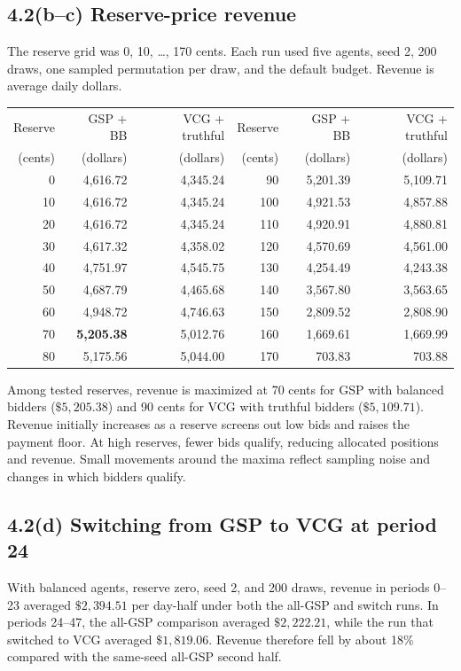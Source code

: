 \documentclass[10pt]{article}
\begin{document}
\subsection*{4.2(b--c) Reserve-price revenue}
The reserve grid was 0, 10, \ldots, 170 cents. Each run used five agents, seed 2, 200 draws, one sampled permutation per draw, and the default budget. Revenue is average daily dollars.

\begin{center}
\small
\setlength{\tabcolsep}{3.5pt}
\begin{tabular}{r|rr@{\qquad}r|rr}
\toprule
Reserve & GSP + BB & VCG + truthful & Reserve & GSP + BB & VCG + truthful \\
(cents) & (dollars) & (dollars) & (cents) & (dollars) & (dollars) \\
\midrule
0   & 4,616.72 & 4,345.24 & 90  & 5,201.39 & 5,109.71 \\
10  & 4,616.72 & 4,345.24 & 100 & 4,921.53 & 4,857.88 \\
20  & 4,616.72 & 4,345.24 & 110 & 4,920.91 & 4,880.81 \\
30  & 4,617.32 & 4,358.02 & 120 & 4,570.69 & 4,561.00 \\
40  & 4,751.97 & 4,545.75 & 130 & 4,254.49 & 4,243.38 \\
50  & 4,687.79 & 4,465.68 & 140 & 3,567.80 & 3,563.65 \\
60  & 4,948.72 & 4,746.63 & 150 & 2,809.52 & 2,808.90 \\
70  & \textbf{5,205.38} & 5,012.76 & 160 & 1,669.61 & 1,669.99 \\
80  & 5,175.56 & 5,044.00 & 170 & 703.83 & 703.88 \\
\bottomrule
\end{tabular}
\end{center}

Among tested reserves, revenue is maximized at 70 cents for GSP with balanced bidders ($\$5{,}205.38$) and 90 cents for VCG with truthful bidders ($\$5{,}109.71$). Revenue initially increases as a reserve screens out low bids and raises the payment floor. At high reserves, fewer bids qualify, reducing allocated positions and revenue. Small movements around the maxima reflect sampling noise and changes in which bidders qualify.

\subsection*{4.2(d) Switching from GSP to VCG at period 24}
With balanced agents, reserve zero, seed 2, and 200 draws, revenue in periods 0--23 averaged $\$2{,}394.51$ per day-half under both the all-GSP and switch runs. In periods 24--47, the all-GSP comparison averaged $\$2{,}222.21$, while the run that switched to VCG averaged $\$1{,}819.06$. Revenue therefore fell by about 18\% compared with the same-seed all-GSP second half.
\end{document}

